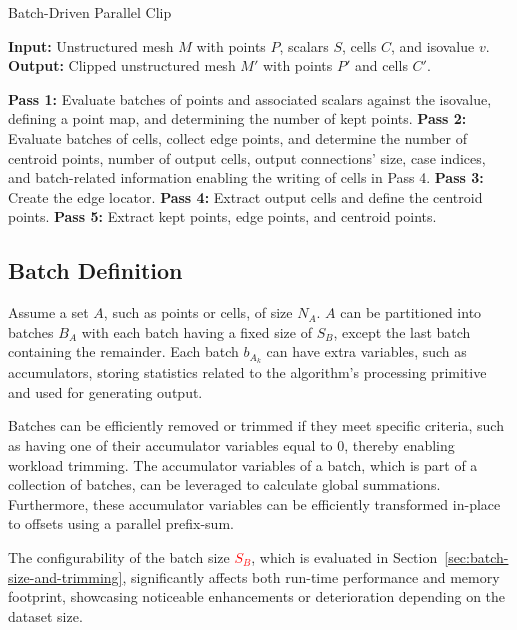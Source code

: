 \documentclass{egpubl}
\newcommand*{\fix}[1]{\textcolor{red}{#1}}
\begin{document}
\begin{algorithm}
\caption{Batch-Driven Parallel Clip}
\label{alg:par-iso}
\raggedright
\textbf{Input:} Unstructured mesh $M$ with points $P$, scalars $S$, cells $C$, and isovalue $v$.\\
\textbf{Output:} Clipped unstructured mesh $M'$ with points $P'$ and cells $C'$.
\begin{algorithmic}[1]
    \State \textbf{Pass 1:} Evaluate batches of points and associated scalars against the isovalue, defining a point map, and determining the number of kept points.
    \State \textbf{Pass 2:} Evaluate batches of cells, collect edge points, and determine the number of centroid points, number of output cells, output connections' size, case indices, and batch-related information enabling the writing of cells in Pass 4.
    \State \textbf{Pass 3:} Create the edge locator.
    \State \textbf{Pass 4:} Extract output cells and define the centroid points.
    \State \textbf{Pass 5:} Extract kept points, edge points, and centroid points.
\end{algorithmic}
\end{algorithm}

\subsection{Batch Definition}

Assume a set $A$, such as points or cells, of size $N_A$. $A$ can be partitioned into batches $B_A$ with each batch having a fixed size of $S_B$, except the last batch containing the remainder. Each batch $b_{A_k}$ can have extra variables, such as accumulators, storing statistics related to the algorithm's processing primitive and used for generating output.

Batches can be efficiently removed or trimmed if they meet specific criteria, such as having one of their accumulator variables equal to $0$, thereby enabling workload trimming. The accumulator variables of a batch, which is part of a collection of batches, can be leveraged to calculate global summations. Furthermore, these accumulator variables can be efficiently transformed in-place to offsets using a parallel prefix-sum.

The configurability of the batch size \fix{$S_B$}, which is evaluated in Section~\ref{sec:batch-size-and-trimming}, 
significantly affects both run-time performance and memory footprint, showcasing noticeable enhancements or deterioration depending on the dataset size.
\end{document}
